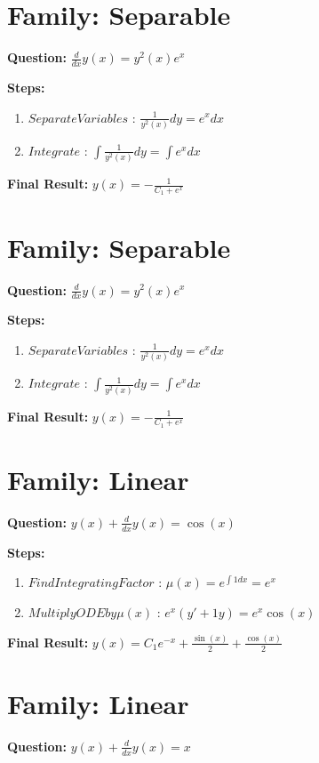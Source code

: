 \documentclass{article}
\begin{document}
\section*{Family: Separable}
\textbf{Question:} $\frac{d}{d x} y{\left(x \right)} = y^{2}{\left(x \right)} e^{x}$

\textbf{Steps:}
\begin{enumerate}
\item $Separate Variables$ :  $\frac{1}{y^{2}{\left(x \right)}} dy = e^{x} dx$
\item $Integrate$ :  $\int \frac{1}{y^{2}{\left(x \right)}} dy = \int e^{x} dx$
\end{enumerate}
\textbf{Final Result:} $y{\left(x \right)} = - \frac{1}{C_{1} + e^{x}}$

\section*{Family: Separable}
\textbf{Question:} $\frac{d}{d x} y{\left(x \right)} = y^{2}{\left(x \right)} e^{x}$

\textbf{Steps:}
\begin{enumerate}
\item $Separate Variables$ :  $\frac{1}{y^{2}{\left(x \right)}} dy = e^{x} dx$
\item $Integrate$ :  $\int \frac{1}{y^{2}{\left(x \right)}} dy = \int e^{x} dx$
\end{enumerate}
\textbf{Final Result:} $y{\left(x \right)} = - \frac{1}{C_{1} + e^{x}}$

\section*{Family: Linear}
\textbf{Question:} $y{\left(x \right)} + \frac{d}{d x} y{\left(x \right)} = \cos{\left(x \right)}$

\textbf{Steps:}
\begin{enumerate}
\item $Find Integrating Factor$ :  $\mu(x) = e^{\int 1 dx} = e^{x}$
\item $Multiply ODE by \mu(x)$ :  $e^{x}(y' + 1y) = e^{x} \cos{\left(x \right)}$
\end{enumerate}
\textbf{Final Result:} $y{\left(x \right)} = C_{1} e^{- x} + \frac{\sin{\left(x \right)}}{2} + \frac{\cos{\left(x \right)}}{2}$

\section*{Family: Linear}
\textbf{Question:} $y{\left(x \right)} + \frac{d}{d x} y{\left(x \right)} = x$
\end{document}
